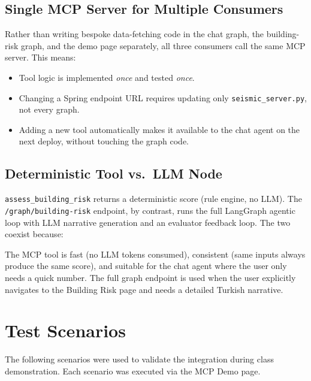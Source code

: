 \documentclass[11pt,a4paper]{article}
\begin{document}
\subsection{Single MCP Server for Multiple Consumers}

Rather than writing bespoke data-fetching code in the chat graph, the building-risk
graph, and the demo page separately, all three consumers call the same MCP server.
This means:

\begin{itemize}[leftmargin=1.2em]
    \item Tool logic is implemented \textit{once} and tested \textit{once}.
    \item Changing a Spring endpoint URL requires updating only
          \texttt{seismic\_server.py}, not every graph.
    \item Adding a new tool automatically makes it available to the chat agent on
          the next deploy, without touching the graph code.
\end{itemize}

\subsection{Deterministic Tool vs.\ LLM Node}

\texttt{assess\_building\_risk} returns a deterministic score (rule engine, no LLM).
The \texttt{/graph/building-risk} endpoint, by contrast, runs the full LangGraph
agentic loop with LLM narrative generation and an evaluator feedback loop. The two
coexist because:

\begin{designnote}
The MCP tool is fast (no LLM tokens consumed), consistent (same inputs always
produce the same score), and suitable for the chat agent where the user only needs
a quick number. The full graph endpoint is used when the user explicitly navigates
to the Building Risk page and needs a detailed Turkish narrative.
\end{designnote}

\section{Test Scenarios}

The following scenarios were used to validate the integration during class
demonstration. Each scenario was executed via the MCP Demo page.
\end{document}
